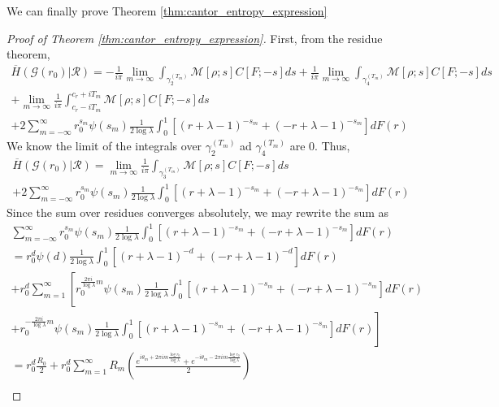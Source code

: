 \documentclass{article}
\newcommand{\tti}{\rightarrow\infty}
\newcommand{\graph}{\mathcal{G}}
\begin{document}
We can finally prove Theorem \ref{thm:cantor_entropy_expression}
\begin{proof}[Proof of Theorem \ref{thm:cantor_entropy_expression}]
    First, from the residue theorem,
    \begin{align}
        \overline{H}(\graph(r_0)|\mathcal{R}) = -\frac{1}{i\pi}\lim_{m\tti}\int_{\gamma_2^{(T_m)}}\mathcal{M}[\rho; s]C[F;-s]ds+\frac{1}{i\pi}\lim_{m\tti}\int_{\gamma_4^{(T_m)}}\mathcal{M}[\rho; s]C[F;-s]ds \nonumber \\
        + \lim_{m\tti} \frac{1}{i\pi}\int_{c_r-iT_m}^{c_r+iT_m} \mathcal{M}[\rho; s]C[F;-s]ds \nonumber \\ + 2\sum_{m=-\infty}^{\infty}r_0^{s_m}\psi(s_m)\frac{1}{2\log\lambda}\int_0^1 \left[(r+\lambda-1)^{-s_m}+(-r+\lambda-1)^{-s_m}\right]dF(r)
    \end{align}
    We know the limit of the integrals over $\gamma_2^{(T_m)}$ ad $\gamma_4^{(T_m)}$ are 0. Thus,
        \begin{align}
    \label{eq:entropy_as_contours}
        \overline{H}(\graph(r_0)|\mathcal{R}) = 
        \lim_{m\tti} \frac{1}{i\pi}\int_{\gamma_3^{(T_m)}} \mathcal{M}[\rho; s]C[F;-s]ds \nonumber \\ + 2\sum_{m=-\infty}^{\infty}r_0^{s_m}\psi(s_m)\frac{1}{2\log\lambda}\int_0^1 \left[(r+\lambda-1)^{-s_m}+(-r+\lambda-1)^{-s_m}\right]dF(r)
    \end{align}
    Since the sum over residues converges absolutely, we may rewrite the sum as
    \begin{align}
        \sum_{m=-\infty}^{\infty}r_0^{s_m}\psi(s_m)\frac{1}{2\log\lambda}\int_0^1 \left[(r+\lambda-1)^{-s_m}+(-r+\lambda-1)^{-s_m}\right]dF(r) \nonumber \\ 
        = r_0^d\psi(d)\frac{1}{2\log \lambda}\int_0^1\left[(r+\lambda-1)^{-d}+(-r+\lambda-1)^{-d}\right]dF(r) \nonumber \\ + r_0^d\sum_{m=1}^{\infty}\left[r_0^{\frac{2\pi i}{\log \lambda}m}\psi(s_m)\frac{1}{2\log\lambda}\int_0^1 \left[(r+\lambda-1)^{-s_m}+(-r+\lambda-1)^{-s_m}\right] dF(r)\right. \nonumber \\ \left. +r_0^{-\frac{2\pi i}{\log \lambda}m}\psi(s_m)\frac{1}{2\log\lambda}\int_0^1 \left[(r+\lambda-1)^{-s_m}+(-r+\lambda-1)^{-s_m}\right]dF(r)\right] \nonumber \\
        = r_0^d \frac{R_0}{2} + r_0^d\sum_{m=1}^{\infty} R_m\left(\frac{e^{i\theta_m + 2\pi i m\frac{\log r_0}{\log \lambda}}+e^{-i\theta_m - 2\pi i m\frac{\log r_0}{\log \lambda}}}{2}\right) \nonumber \\

\end{align}
\end{proof}
\end{document}
